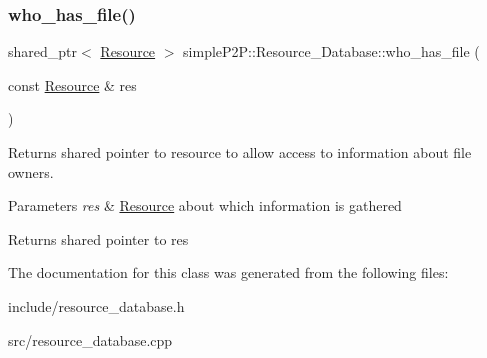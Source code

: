 \subsubsection{\texorpdfstring{who\+\_\+has\+\_\+file()}{who\_has\_file()}\hspace{0.1cm}{\footnotesize\ttfamily [2/2]}}
{\footnotesize\ttfamily shared\+\_\+ptr$<$ \hyperlink{classsimpleP2P_1_1Resource}{Resource} $>$ simple\+P2\+P\+::\+Resource\+\_\+\+Database\+::who\+\_\+has\+\_\+file (\begin{DoxyParamCaption}\item[{const \hyperlink{classsimpleP2P_1_1Resource}{Resource} \&}]{res }\end{DoxyParamCaption})}



Returns shared pointer to resource to allow access to information about file owners. 


\begin{DoxyParams}{Parameters}
{\em res} & \hyperlink{classsimpleP2P_1_1Resource}{Resource} about which information is gathered \\
\hline
\end{DoxyParams}
\begin{DoxyReturn}{Returns}
shared pointer to res 
\end{DoxyReturn}


The documentation for this class was generated from the following files\+:\begin{DoxyCompactItemize}
\item 
include/resource\+\_\+database.\+h\item 
src/resource\+\_\+database.\+cpp\end{DoxyCompactItemize}
